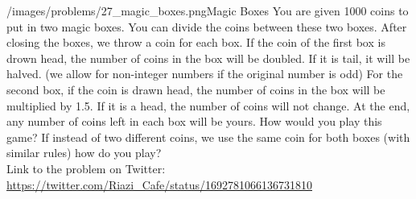 \begin{problem}{/images/problems/27_magic_boxes.png}{Magic Boxes}
	You are given 1000 coins to put in two magic boxes. You can divide the coins between these two boxes. After closing the boxes, we throw a coin for each box.
If the coin of the first box is drown head, the number of coins in the box will be doubled. If it is tail, it will be halved. (we allow for non-integer numbers if the original number is odd)
For the second box, if the coin is drawn head, the number of coins in the box will be multiplied by 1.5. If it is a head, the number of coins will  not change.
At the end, any number of coins left in each box will be yours. How would  you play this game?
If instead of two different coins, we use the same coin for both boxes (with similar rules) how do you play?\\[0.2cm]

Link to the problem on Twitter:  \url{https://twitter.com/Riazi_Cafe/status/1692781066136731810}\end{problem}
